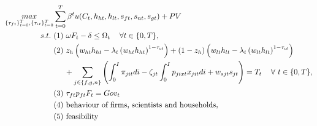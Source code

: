 \begin{align*}
\underset{\{\tau_{ft}\}_{t=0}^{T},\{\tau_{\iota t}\}_{t=0}^{T}}{max}&\sum_{t=0}^{T}\beta^t u(C_{t}, h_{ht}, h_{lt}, s_{ft}, s_{nt}, s_{gt})%
+ PV\\
s.t.\ %
& (1)\ \omega F_{t} -\delta \leq \Omega_t \ \hspace{3mm} \forall t \in\{0,T\}, \\ %
& (2)\ z_h\left(w_{ht}h_{ht}-\lambda_t \left(w_{ht}h_{ht}\right)^{1-\tau_{\iota t}}\right)+(1-z_h)\left(w_{lt}h_{lt}-\lambda_t\left(w_{lt}h_{lt}\right)^{1-\tau_{\iota t}}\right) \\
& \hspace{5mm} +\sum_{j\in\{f,g,n\}}\left(\int_{0}^{I}\pi_{jit}di-\zeta_{jt}\int_{0}^{I}p_{jixt}x_{jit}di+w_{sjt}s_{jt}\right)= T_t \ \hspace{3mm} \forall \ t\in\{0,T\}, \\
& (3)\ \tau_{ft}p_{ft}F_{t} = Gov_t\\
& (4)\ \text{behaviour of firms, scientists and households},\\
& (5)\ \text{feasibility}
\end{align*}

